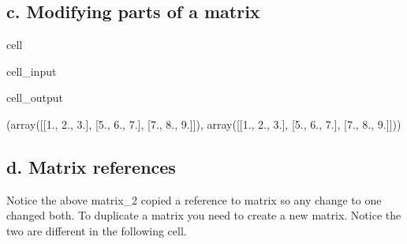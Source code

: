 \documentclass[letterpaper,10pt,english]{jupyterBook}
\begin{document}
\subsection{c. Modifying parts of a matrix}
\label{\detokenize{lessons/Intro_to_Matrices_in_NumPy:c-modifying-parts-of-a-matrix}}
\begin{sphinxuseclass}{cell}\begin{sphinxVerbatimInput}

\begin{sphinxuseclass}{cell_input}
\begin{sphinxVerbatim}[commandchars=\\\{\}]
  
\PYG{p}{[}\PYG{p}{]}  \PYG{p}{[}\PYG{p}{]}  
 
\end{sphinxVerbatim}

\end{sphinxuseclass}\end{sphinxVerbatimInput}
\begin{sphinxVerbatimOutput}

\begin{sphinxuseclass}{cell_output}
\begin{sphinxVerbatim}[commandchars=\\\{\}]
(array([[1., 2., 3.],
        [5., 6., 7.],
        [7., 8., 9.]]),
 array([[1., 2., 3.],
        [5., 6., 7.],
        [7., 8., 9.]]))
\end{sphinxVerbatim}

\end{sphinxuseclass}\end{sphinxVerbatimOutput}

\end{sphinxuseclass}

\subsection{d. Matrix references}
\label{\detokenize{lessons/Intro_to_Matrices_in_NumPy:d-matrix-references}}
\sphinxAtStartPar
Notice the above matrix\_2 copied a reference to matrix so any change to one changed both. To duplicate a matrix you need to create a new matrix. Notice the two are different in the following cell.
\end{document}
